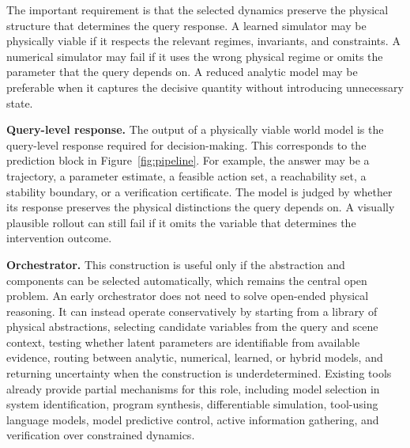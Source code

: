 \documentclass{article}
\begin{document}

The important requirement is that the selected dynamics preserve the physical structure that determines the query response. A learned simulator may be physically viable if it respects the relevant regimes, invariants, and constraints. A numerical simulator may fail if it uses the wrong physical regime or omits the parameter that the query depends on. A reduced analytic model may be preferable when it captures the decisive quantity without introducing unnecessary state. 

\textbf{Query-level response.} The output of a physically viable world model is the query-level response required for decision-making. This corresponds to the prediction block in Figure~\ref{fig:pipeline}. 
For example, the answer may be a trajectory, a parameter estimate, a feasible action set, a reachability set, a stability boundary, or a verification certificate. The model is judged by whether its response preserves the physical distinctions the query depends on. A visually plausible rollout can still fail if it omits the variable that determines the intervention outcome.

\textbf{Orchestrator.} This construction is useful only if the abstraction and components can be selected automatically, which remains the central open problem. An early orchestrator does not need to solve open-ended physical reasoning. It can instead operate conservatively by starting from a library of physical abstractions, selecting candidate variables from the query and scene context, testing whether latent parameters are identifiable from available evidence, routing between analytic, numerical, learned, or hybrid models, and returning uncertainty when the construction is underdetermined. Existing tools already provide partial mechanisms for this role, including model selection in system identification, program synthesis, differentiable simulation, tool-using language models, model predictive control, active information gathering, and verification over constrained dynamics.
\end{document}
